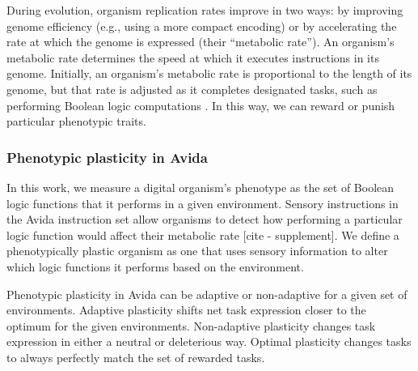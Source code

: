 
During evolution, organism replication rates improve in two ways: by improving genome efficiency (e.g., using a more compact encoding) or by accelerating the rate at which the genome is expressed (their ``metabolic rate'').
An organism's metabolic rate determines the speed at which it executes instructions in its genome.
Initially, an organism's metabolic rate is proportional to the length of its genome, but that rate is adjusted as it completes designated tasks, such as performing Boolean logic computations \citep{ofria_avida:_2009}.
In this way, we can reward or punish particular phenotypic traits. 

\subsubsection{Phenotypic plasticity in Avida}


In this work, we measure a digital organism's phenotype as the set of Boolean logic functions that it performs in a given environment.
Sensory instructions in the Avida instruction set allow organisms to detect how performing a particular logic function would affect their metabolic rate [cite - supplement]. 
We define a phenotypically plastic organism as one that uses sensory information to alter which logic functions it performs based on the environment.

Phenotypic plasticity in Avida can be adaptive or non-adaptive for a given set of environments.
Adaptive plasticity shifts net task expression closer to the optimum for the given environments.
Non-adaptive plasticity changes task expression in either a neutral or deleterious way.%
Optimal plasticity changes tasks to always perfectly match the set of rewarded tasks.%


